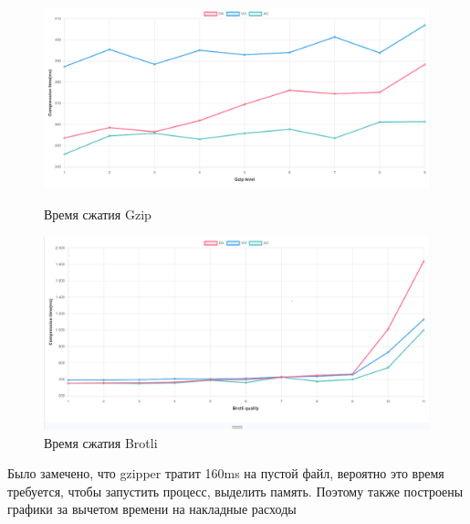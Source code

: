 \documentclass[12pt]{article}
\begin{document}
\begin{figure}[H]
    \centering
    \begin{minipage}{0.48\textwidth}
        \centering
        \includegraphics[width=\linewidth]{../images/Gzip compression time (Trimmed Mean).png}
        \caption{Время сжатия Gzip}
        \label{fig:image1}
    \end{minipage}
    \hfill
    \begin{minipage}{0.48\textwidth}
        \centering
        \includegraphics[width=\linewidth]{../images/Brotli compression time (Trimmed Mean).png}
        \caption{Время сжатия Brotli}
        \label{fig:image2}
    \end{minipage}
\end{figure}

Было замечено, что gzipper тратит 160ms на пустой файл, вероятно это время требуется, чтобы запустить процесс,
выделить память. Поэтому также построены графики за вычетом времени на накладные расходы
\end{document}
